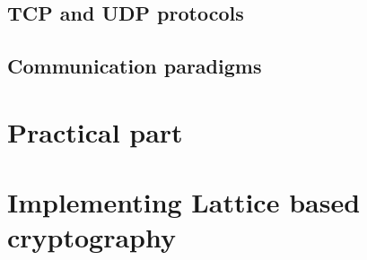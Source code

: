 \section{TCP and UDP protocols}
\label{sec:tcp_and_udp}


\section{Communication paradigms}
\label{sec:comm_paradigms}


\chapter{Practical part}
\label{ch:pratical_part}


\chapter{Implementing Lattice based cryptography}



